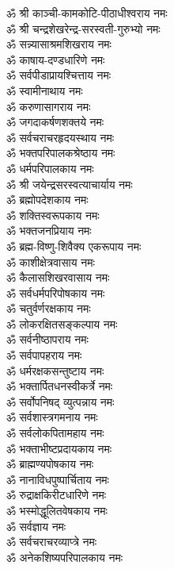 \begin{flushleft}
\begin{multicols}{2}
ॐ श्री काञ्ची-कामकोटि-पीठाधीश्वराय नमः\\
ॐ श्री चन्द्रशेखरेन्द्र-सरस्वती-गुरुभ्यो नमः\\
ॐ सन्न्यासाश्रमशिखराय नमः\\
ॐ काषाय-दण्डधारिणे नमः\\
ॐ सर्वपीडाप्रायश्चित्ताय नमः\\
ॐ स्वामीनाथाय नमः\\
ॐ करुणासागराय नमः\\
ॐ जगदाकर्षणशक्तये नमः\\
ॐ सर्वचराचरहृदयस्थाय नमः\\
ॐ भक्तपरिपालकश्रेष्ठाय नमः\hfill{}\\
ॐ धर्मपरिपालकाय नमः\\
ॐ श्री जयेन्द्रसरस्वत्याचार्याय नमः\\
ॐ ब्रह्मोपदेशकाय नमः\\
ॐ शक्तिस्वरूपकाय नमः\\
ॐ भक्तजनप्रियाय नमः\\
ॐ ब्रह्म-विष्णु-शिवैक्य एकरूपाय नमः\\
ॐ काशीक्षेत्रवासाय नमः\\
ॐ कैलासशिखरवासाय नमः\\
ॐ सर्वधर्मपरिपोषकाय नमः\\
ॐ चतुर्वर्णरक्षकाय नमः\hfill{}\\
ॐ लोकरक्षितसङ्कल्पाय नमः\\
ॐ सर्वनीष्ठापराय नमः\\
ॐ सर्वपापहराय नमः\\
ॐ धर्मरक्षकसन्तुष्टाय नमः\\
ॐ भक्तार्पितधनस्वीकर्त्रे नमः\\
ॐ सर्वोपनिषद् व्युत्पन्नाय नमः\\
ॐ सर्वशास्त्रगमनाय नमः\\
ॐ सर्वलोकपितामहाय नमः\\
ॐ भक्ताभीष्टप्रदायकाय नमः\\
ॐ ब्राह्मण्यपोषकाय नमः\hfill{}\\
ॐ नानाविधपुष्पार्चिताय नमः\\
ॐ रुद्राक्षकिरीटधारिणे नमः\\
ॐ भस्मोद्धूलितवेषकाय नमः\\
ॐ सर्वज्ञाय नमः\\
ॐ सर्वचराचरव्याप्त्रे नमः\\
ॐ अनेकशिष्यपरिपालकाय नमः\\

\end{multicols}
\end{flushleft}
